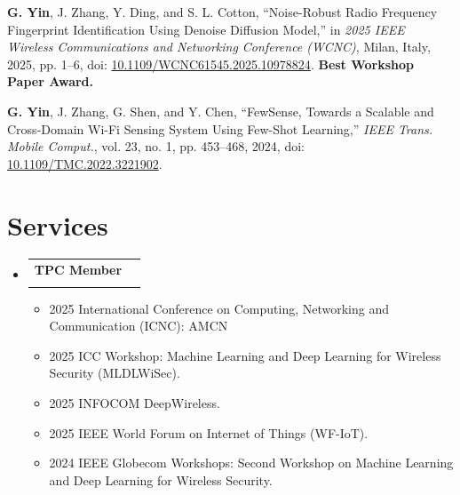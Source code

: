 \documentclass[a4paper,11pt]{article}
\makeatletter
\newcommand{\resumeProject}[4]{
\vspace{0.5mm}\item
    \begin{tabular*}{0.98\textwidth}[t]{l@{\extracolsep{\fill}}r}
        \textbf{#1} & \textit{\footnotesize{#3}} \\
        \footnotesize{\textit{#2}} & \footnotesize{#4}
    \end{tabular*}
    \vspace{-2.4mm}
}
\newcommand{\resumeSubHeadingListStart}{\begin{itemize}[leftmargin=*,labelsep=1mm]}
\newcommand{\resumeItemListStart}{\begin{itemize}[leftmargin=*,labelsep=1mm,itemsep=0.5mm]}
\newcommand{\resumeSubHeadingListEnd}{\end{itemize}\vspace{2mm}}
\newcommand{\resumeItemListEnd}{\end{itemize}\vspace{-2mm}}
\makeatother
\begin{document}
{\begin{enumerate}[leftmargin=*, labelsep=0.5em, align=left, widest={[\textbf{S.1}]}, itemindent=0em, label={\textbf{[\arabic*]}}]
\item \textbf{G. Yin}, J. Zhang, Y. Ding, and S. L. Cotton, “Noise-Robust Radio Frequency Fingerprint Identification Using Denoise Diffusion Model,” in \textit{2025 IEEE Wireless Communications and Networking Conference (WCNC)}, Milan, Italy, 2025, pp. 1--6, doi: \href{https://doi.org/10.1109/WCNC61545.2025.10978824}{10.1109/WCNC61545.2025.10978824}. \textbf{Best Workshop Paper Award.}
\item \textbf{G. Yin}, J. Zhang, G. Shen, and Y. Chen, “FewSense, Towards a Scalable and Cross-Domain Wi-Fi Sensing System Using Few-Shot Learning,” \textit{IEEE Trans. Mobile Comput.}, vol. 23, no. 1, pp. 453--468, 2024, doi: \href{https://doi.org/10.1109/TMC.2022.3221902}{10.1109/TMC.2022.3221902}.
\end{enumerate}
}



\section{\textbf{Services}}
\vspace{-0.4mm}
\resumeSubHeadingListStart



\resumeProject
  {TPC Member}{}{}{}
\resumeItemListStart
       \item 2025 International Conference on Computing, Networking and Communication (ICNC): AMCN
       \item 2025 ICC Workshop: Machine Learning and Deep Learning for Wireless Security (MLDLWiSec).
       \item 2025 INFOCOM DeepWireless.
       \item 2025 IEEE World Forum on Internet of Things (WF-IoT).
       \item 2024 IEEE Globecom Workshops: Second Workshop on Machine Learning and Deep Learning for Wireless Security. %
\resumeItemListEnd

\resumeSubHeadingListEnd
\end{document}
